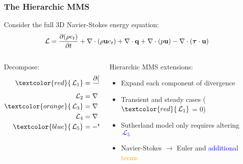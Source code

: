 \documentclass[mathserif]{beamer}
\newcommand{\Lo}{\,\mathcal{L}}
\newcommand{\Diff}[2] {\dfrac{\partial( #1)}{\partial #2}}
\newcommand{\bv}[1]{\ensuremath{\mbox{\boldmath$ #1 $}}}
\begin{document}
\begin{frame}
\frametitle{The Hierarchic MMS}
\small
Consider the full 3D Navier-Stokes energy equation:
\begin{equation}
  \nonumber  
    \Lo= \Diff{\rho e_t}{t}+\nabla \cdot (\rho\mathbf{u}e_t) +\nabla\cdot \mathbf{q} +  \nabla\cdot(p  \mathbf{u}) - \nabla \cdot (\bv{\tau} \cdot \mathbf{u})
\end{equation}

  \begin{columns}[c]

    \begin{column}{4cm}
      Decompose:
      \begin{equation} 
        \begin{split}
          \nonumber
          \textcolor{red}{\Lo_1}&= \Diff{\rho e_t}{t} \\
          \Lo_2&=\nabla \cdot (\rho\mathbf{u}e_t) \\
          \textcolor{orange}{\Lo_3}&=\nabla\cdot \mathbf{q} \\
          \Lo_4&= \nabla\cdot(p  \mathbf{u}) \\
          \textcolor{blue}{\Lo_5}&=- \nabla \cdot (\bv{\tau} \cdot \mathbf{u})
        \end{split}
      \end{equation}
    \end{column}

    \begin{column}{7.5cm}
      \begin{block}{\small Hierarchic MMS extensions:}
        \begin{itemize}
          \small
          \item Expand each component of divergence
          \item Transient and steady cases ($\textcolor{red}{\Lo_1}$ = 0)
          \item Sutherland model only requires altering \textcolor{blue}{$\Lo_5$}
          \item Navier-Stokes $\rightarrow$ Euler and \textcolor{blue}{additional} \textcolor{orange}{terms}
        \end{itemize}        
      \end{block}
    \end{column}       
  \end{columns}
  \normalsize
\end{frame}
\end{document}
